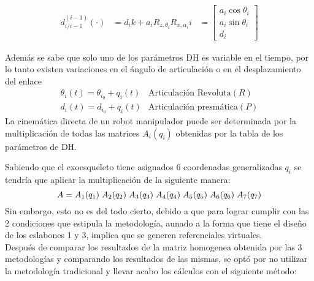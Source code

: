     \vspace{2mm}
    \begin{equation*}
    \begin{array}{ccc}
        d_{i/i-1}^{(i-1)} (\cdot) & = d_i k + a_i R_{z,\theta_i} R_{x,\alpha_i}  i 
        & = \left[  \begin{array}{c}
            a_i \cos{\theta_i} \\
            a_i \sin{\theta_i} \\
            d_i 
        \end{array} \right]
    \end{array}
    \end{equation*}

    \vspace{5mm}
    \noindent Además se sabe que solo uno de los parámetros DH es variable en el tiempo, por lo tanto existen
    variaciones en el ángulo de articulación o en el desplazamiento del enlace\\
    \vspace{-2mm}
    \begin{equation*}
        \begin{array}{cc}
            \theta_i (t) = \theta_{i_0} + q_i (t) & \text{Articulación Revoluta} (R) \\
            d_i (t) = d_{i_0} + q_i (t) & \text{Articulación presmática} (P)
        \end{array}
    \end{equation*}
    \vspace{1mm}
    \noindent La cinemática directa de un robot manipulador puede ser determinada por la multiplicación de todas
    las matrices $A_i (q_i)$ obtenidas por la tabla de los parámetros de DH. 

    \noindent Sabiendo que el exoesqueleto tiene asignados 6 coordenadas generalizadas $q_i$ se tendría que
    aplicar la multiplicación de la siguiente manera:
    \begin{equation*}
    A = A_1(q_1) \hspace{1mm} A_2(q_2) \hspace{1mm} A_3(q_3) \hspace{1mm} A_4(q_4) \hspace{1mm} A_5(q_5)
        \hspace{1mm} A_6(q_6) \hspace{1mm} A_7(q_7)
    \end{equation*}
    \noindent Sin embargo, esto no es del todo cierto, debido a que para lograr cumplir con las 2 condiciones que
    estipula la metodología, aunado a la forma que tiene el diseño de los eslabones 1 y 3, implica que se generen
    referenciales virtuales.     \\ 
    \noindent Después de comparar los resultados de la matriz homogenea obtenida por las 3 metodologías y comparando
    los resultados de las mismas, se optó por no utilizar la metodología tradicional y llevar acabo los cálculos con
    el siguiente método: \\ 
